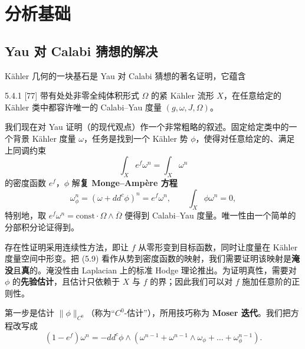 \section{分析基础}

\subsection{Yau 对 Calabi 猜想的解决}

Kähler 几何的一块基石是 Yau 对 Calabi 猜想的著名证明，它蕴含

\begin{theorem}{5.4.1}
[77] 带有处处非零全纯体积形式 $\Omega$ 的紧 Kähler 流形 $X$，在任意给定的 Kähler 类中都容许唯一的 Calabi--Yau 度量 $(g,\omega,J,\Omega)$。
\end{theorem}

我们现在对 Yau 证明（的现代观点）作一个非常粗略的叙述。固定给定类中的一个背景 Kähler 度量 $\omega$，任务是找到一个 Kähler 势 $\phi$，使得对任意给定的、满足上同调约束
\[
\int_X e^f\omega^n=\int_X\omega^n
\]
的密度函数 $e^f$，$\phi$ 解\textbf{复 Monge--Ampère 方程}
\begin{equation}
\omega_\phi^n=(\omega+dd^c\phi)^n=e^f\omega^n,\qquad \int_X\phi\omega^n=0, \tag{5.9}
\end{equation}
特别地，取 $e^f\omega^n=\mathrm{const}\cdot\Omega\wedge\overline{\Omega}$ 便得到 Calabi--Yau 度量。唯一性由一个简单的分部积分论证得到。


存在性证明采用连续性方法，即让 $f$ 从零形变到目标函数，同时让度量在 Kähler 度量空间中形变。把 (5.9) 看作从势到密度函数的映射，我们需要证明该映射是\textbf{淹没}且\textbf{真}的。淹没性由 Laplacian 上的标准 Hodge 理论推出。为证明真性，需要对 $\phi$ 的\textbf{先验估计}，且估计只依赖于 $X$ 与 $f$ 的界；因此我们可以对 $f$ 施加任意阶的正则性。

第一步是估计 $\|\phi\|_{C^0}$（称为“$C^0$-估计”），所用技巧称为 \textbf{Moser 迭代}。我们把方程改写成
\[
(1-e^f)\omega^n = -dd^c\phi\wedge(\omega^{n-1}+\omega^{n-1}\wedge\omega_\phi+\dots+\omega_\phi^{n-1}).
\]

